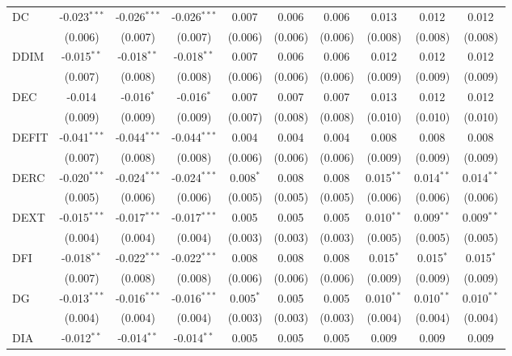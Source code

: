 \begin{table}[!htbp]
\begin{tabular}{@{\extracolsep{5pt}}lccccccccc}
 DC & -0.023$^{***}$ & -0.026$^{***}$ & -0.026$^{***}$ & 0.007$^{}$ & 0.006$^{}$ & 0.006$^{}$ & 0.013$^{}$ & 0.012$^{}$ & 0.012$^{}$ \\
  & (0.006) & (0.007) & (0.007) & (0.006) & (0.006) & (0.006) & (0.008) & (0.008) & (0.008) \\
 DDIM & -0.015$^{**}$ & -0.018$^{**}$ & -0.018$^{**}$ & 0.007$^{}$ & 0.006$^{}$ & 0.006$^{}$ & 0.012$^{}$ & 0.012$^{}$ & 0.012$^{}$ \\
  & (0.007) & (0.008) & (0.008) & (0.006) & (0.006) & (0.006) & (0.009) & (0.009) & (0.009) \\
 DEC & -0.014$^{}$ & -0.016$^{*}$ & -0.016$^{*}$ & 0.007$^{}$ & 0.007$^{}$ & 0.007$^{}$ & 0.013$^{}$ & 0.012$^{}$ & 0.012$^{}$ \\
  & (0.009) & (0.009) & (0.009) & (0.007) & (0.008) & (0.008) & (0.010) & (0.010) & (0.010) \\
 DEFIT & -0.041$^{***}$ & -0.044$^{***}$ & -0.044$^{***}$ & 0.004$^{}$ & 0.004$^{}$ & 0.004$^{}$ & 0.008$^{}$ & 0.008$^{}$ & 0.008$^{}$ \\
  & (0.007) & (0.008) & (0.008) & (0.006) & (0.006) & (0.006) & (0.009) & (0.009) & (0.009) \\
 DERC & -0.020$^{***}$ & -0.024$^{***}$ & -0.024$^{***}$ & 0.008$^{*}$ & 0.008$^{}$ & 0.008$^{}$ & 0.015$^{**}$ & 0.014$^{**}$ & 0.014$^{**}$ \\
  & (0.005) & (0.006) & (0.006) & (0.005) & (0.005) & (0.005) & (0.006) & (0.006) & (0.006) \\
 DEXT & -0.015$^{***}$ & -0.017$^{***}$ & -0.017$^{***}$ & 0.005$^{}$ & 0.005$^{}$ & 0.005$^{}$ & 0.010$^{**}$ & 0.009$^{**}$ & 0.009$^{**}$ \\
  & (0.004) & (0.004) & (0.004) & (0.003) & (0.003) & (0.003) & (0.005) & (0.005) & (0.005) \\
 DFI & -0.018$^{**}$ & -0.022$^{***}$ & -0.022$^{***}$ & 0.008$^{}$ & 0.008$^{}$ & 0.008$^{}$ & 0.015$^{*}$ & 0.015$^{*}$ & 0.015$^{*}$ \\
  & (0.007) & (0.008) & (0.008) & (0.006) & (0.006) & (0.006) & (0.009) & (0.009) & (0.009) \\
 DG & -0.013$^{***}$ & -0.016$^{***}$ & -0.016$^{***}$ & 0.005$^{*}$ & 0.005$^{}$ & 0.005$^{}$ & 0.010$^{**}$ & 0.010$^{**}$ & 0.010$^{**}$ \\
  & (0.004) & (0.004) & (0.004) & (0.003) & (0.003) & (0.003) & (0.004) & (0.004) & (0.004) \\
 DIA & -0.012$^{**}$ & -0.014$^{**}$ & -0.014$^{**}$ & 0.005$^{}$ & 0.005$^{}$ & 0.005$^{}$ & 0.009$^{}$ & 0.009$^{}$ & 0.009$^{}$ \\

\end{tabular}
\end{table}
